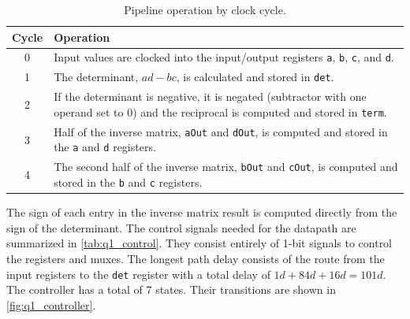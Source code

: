 \documentclass[../main.tex]{subfiles}
\begin{document}
\begin{table}[h]
    \centering
    \renewcommand{\arraystretch}{1.5}
    \setlength{\tabcolsep}{8pt}
    \begin{tabularx}{\textwidth}{@{}cX@{}}
        \toprule
        \textbf{Cycle} & \textbf{Operation} \\
        \midrule
        0 & Input values are clocked into the input/output registers \texttt{a}, \texttt{b}, \texttt{c}, and \texttt{d}. \\
        1 & The determinant, $ad - bc$, is calculated and stored in \texttt{det}. \\
        2 & If the determinant is negative, it is negated (subtractor with one operand set to 0) and the reciprocal is computed and stored in \texttt{term}. \\
        3 & Half of the inverse matrix, \texttt{aOut} and \texttt{dOut}, is computed and stored in the \texttt{a} and \texttt{d} registers. \\
        4 & The second half of the inverse matrix, \texttt{bOut} and \texttt{cOut}, is computed and stored in the \texttt{b} and \texttt{c} registers. \\
        \bottomrule
    \end{tabularx}

    \caption{Pipeline operation by clock cycle.}
    \label{tab:pipeline_cycles}
\end{table}

The sign of each entry in the inverse matrix result is computed directly from the sign of the determinant. The control signals needed for the datapath are summarized in \cref{tab:q1_control}. They consist entirely of 1-bit signals to control the registers and muxes. The longest path delay consists of the route from the input registers to the \texttt{det} register with a total delay of $1d + 84d + 16d = 101d$. The controller has a total of 7 states. Their transitions are shown in \cref{fig:q1_controller}.

\newpage
\end{document}
